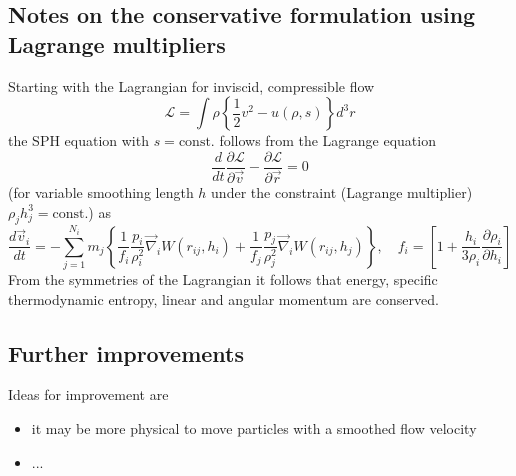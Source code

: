 
\subsection{Notes on the conservative formulation using Lagrange multipliers}
Starting with the Lagrangian for inviscid, compressible flow
\begin{equation}
    \mathcal{L}=\int \rho\left\{\frac{1}{2} v^2-u(\rho, s)\right\} d^3 r
\end{equation}
the SPH equation with $s = \text{const.}$ follows from the Lagrange equation
\begin{equation}
    \frac{d}{d t} \frac{\partial \mathcal{L}}{\partial \vec{v}}-\frac{\partial \mathcal{L}}{\partial \vec{r}}=0
\end{equation}
(for variable smoothing length $h$ under the constraint (Lagrange multiplier) $\rho_j h_j^3 = \text{const.}$) as
\begin{equation}
    \frac{d \vec{v}_i}{d t}=-\sum_{j=1}^{N_i} m_j\left\{\frac{1}{f_i} \frac{p_i}{\rho_i^2} \vec{\nabla}_i W\left(r_{i j}, h_i\right)+\frac{1}{f_j} \frac{p_j}{\rho_j^2} \vec{\nabla}_i W\left(r_{i j}, h_j\right)\right\}, \quad f_i=\left[1+\frac{h_i}{3 \rho_i} \frac{\partial \rho_i}{\partial h_i}\right]
\end{equation}
From the symmetries of the Lagrangian it follows that energy, specific thermodynamic entropy, linear and angular momentum are conserved.

\subsection{Further improvements}
Ideas for improvement are
\begin{itemize}
    \item it may be more physical to move particles with a smoothed flow velocity
    \item ...
\end{itemize}

